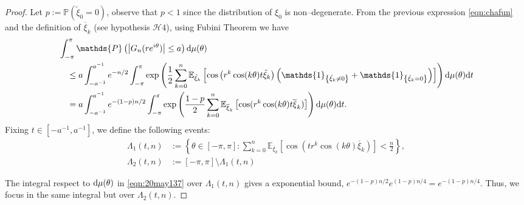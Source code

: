 \documentclass[12pt]{amsart}
\theoremstyle{plain}
\numberwithin{equation}{section}
\renewcommand{\Pr}{\mathbb{P}}
\newcommand{\<}{\langle}
\renewcommand{\>}{\rangle}
\newcommand{\PP}[1]{\left(#1\right)}
\newcommand{\CC}[1]{\left[#1\right]}
\newcommand{\LL}[1]{\left\{#1\right\}}
\newcommand{\dd}{\textnormal{d}}
\newcommand{\E}[2][ ]{\mathbb{E}{#1}\left[#2\right]}
\newcommand{\abs}[1]{\left|#1\right|}
\renewcommand{\Pr}[1]{\mathds{P}\left(#1\right)}
\renewcommand{\line}{\overline}
\begin{document}
\begin{proof}
Let $p:=\Pr{\tilde{\xi}_0=0}$, observe that $p<1$ since the distribution of $\xi_0$ is non--degenerate. From the previous expression \ref{eqn:chafun} and the definition of $\line{\xi}_k$ (see hypothesis $\mathcal{H}4$), using Fubini Theorem we have
\begin{align}
&  \int_{-\pi}^{\pi} \Pr{\abs{G_n(re^{i\theta})} \leq a } \dd \mu(\theta) \nonumber\\
& \quad \leq  a\int_{-a^{-1}}^{a^{-1}} e^{-n/2} \int_{-\pi}^{\pi} \exp\PP{\frac{1}{2}\sum_{k=0}^n \E[_{\tilde{\xi}_k}]{\cos\PP{ r^k\cos(k\theta)t\tilde{\xi}_k } 
\PP{\mathds{1}_{ \LL{\tilde{\xi}_k \neq 0} } + \mathds{1}_{ \LL{\tilde{\xi}_k = 0}} }
}}  \dd\mu(\theta) \dd t \nonumber \\
& \quad = a\int_{-a^{-1}}^{a^{-1}} e^{-(1-p)n/2} \int_{-\pi}^{\pi} \exp\PP{\frac{1-p}{2}\sum_{k=0}^n \E[_{\overline{\xi}_k }]{\cos(r^k\cos(k\theta)t\overline{\xi}_k) }}  \dd\mu(\theta) \dd t. \label{eqn:20may137}
 \end{align}
Fixing $t\in \CC{-a^{-1},a^{-1}}$, we define the following events:
 \begin{align*}
\Lambda_1(t,n) & := \LL{\theta\in[-\pi,\pi] : \sum_{k=0}^n \E[_{\overline{\xi}_k}]{\cos(t r^k\cos(k\theta)\overline{\xi}_k) } <\frac{n}{2} }, \\
\Lambda_2(t,n) & := [-\pi,\pi] \setminus \Lambda_1(t,n) 
\end{align*}
 
 The integral respect to $\dd \mu(\theta)$ in \ref{eqn:20may137} over $\Lambda_1(t,n)$ gives a exponential bound, $e^{-(1-p)n/2} e^{(1-p)n/4} = e^{-(1-p)n/4}$. Thus, we focus in the same integral but over $\Lambda_2(t,n)$.
 

\end{proof}
\end{document}
